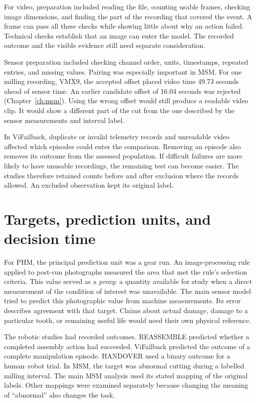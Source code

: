 For video, preparation included reading the file, counting usable frames, checking image dimensions, and finding the part of the recording that covered the event. A frame can pass all these checks while showing little about why an action failed. Technical checks establish that an image can enter the model. The recorded outcome and the visible evidence still need separate consideration.

Sensor preparation included checking channel order, units, timestamps, repeated entries, and missing values. Pairing was especially important in MSM. For one milling recording, VMX9, the accepted offset placed video time 49.73 seconds ahead of sensor time. An earlier candidate offset of 16.04 seconds was rejected (Chapter~\ref{ch:msm}). Using the wrong offset would still produce a readable video clip. It would show a different part of the cut from the one described by the sensor measurements and interval label.

In ViFailback, duplicate or invalid telemetry records and unreadable video affected which episodes could enter the comparison. Removing an episode also removes its outcome from the assessed population. If difficult failures are more likely to have unusable recordings, the remaining test can become easier. The studies therefore retained counts before and after exclusion where the records allowed. An excluded observation kept its original label.

\section{Targets, prediction units, and decision time}
\label{sec:ch4-targets}

For PHM, the principal prediction unit was a gear run. An image-processing rule applied to post-run photographs measured the area that met the rule’s selection criteria. This value served as a \emph{proxy}: a quantity available for study when a direct measurement of the condition of interest was unavailable. The main sensor model tried to predict this photographic value from machine measurements. Its error describes agreement with that target. Claims about actual damage, damage to a particular tooth, or remaining useful life would need their own physical reference.

The robotic studies had recorded outcomes. REASSEMBLE predicted whether a completed assembly action had succeeded. ViFailback predicted the outcome of a complete manipulation episode. HANDOVER used a binary outcome for a human–robot trial. In MSM, the target was abnormal cutting during a labelled milling interval. The main MSM analysis used its stated mapping of the original labels. Other mappings were examined separately because changing the meaning of “abnormal” also changes the task.

